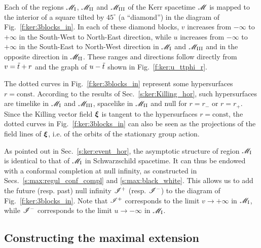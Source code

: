 Each of the regions $\mathscr{M}_{\rm I}$, $\mathscr{M}_{\rm II}$ and $\mathscr{M}_{\rm III}$ of the Kerr spacetime
$\mathscr{M}$ is mapped to the interior of a square tilted by $45^\circ$ (a ``diamond'')
in the diagram of Fig.~\ref{f:ker:3blocks_in}. In each of these diamond
blocks, $v$ increases from $-\infty$ to $+\infty$ in the South-West to North-East direction,
while $u$ increases from $-\infty$ to $+\infty$ in the South-East to North-West direction
in  $\mathscr{M}_{\rm I}$ and $\mathscr{M}_{\rm III}$ and in the opposite direction in $\mathscr{M}_{\rm II}$.
These ranges and directions follow directly from $v = {\tilde t} + r$
and the graph of $u - {\tilde t}$ shown in Fig.~\ref{f:ker:u_ttphi_r}.

The dotted curves in Fig.~\ref{f:ker:3blocks_in} represent some hypersurfaces
$r=\mathrm{const}$. According to the results
of Sec.~\ref{s:ker:Killing_hor}, such hypersurfaces are timelike in
$\mathscr{M}_{\rm I}$ and $\mathscr{M}_{\rm III}$, spacelike in $\mathscr{M}_{\rm II}$ and null for
$r=r_-$ or $r=r_+$. Since the Killing vector field $\bm{\xi}$ is tangent
to the hypersurfaces $r=\mathrm{const}$, the dotted curves in Fig.~\ref{f:ker:3blocks_in}
can also be seen as the projections of the field lines
of $\bm{\xi}$, i.e. of the orbits of the stationary group action.

As pointed out in Sec.~\ref{s:ker:event_hor}, the asymptotic structure of
region $\mathscr{M}_{\rm I}$ is identical to that of $\mathscr{M}_{\rm I}$ in Schwarzschild spacetime.
It can thus be endowed with a conformal completion at null infinity, as
constructed in Secs.~\ref{s:max:regul_conf_compl} and \ref{s:max:black_white}.
This allows us to add the future (resp. past) null infinity $\mathscr{I}^+$ (resp. $\mathscr{I}^-$)
to the diagram of Fig.~\ref{f:ker:3blocks_in}. Note that $\mathscr{I}^+$ corresponds to the
limit $v\to +\infty$ in $\mathscr{M}_{\rm I}$, while $\mathscr{I}^-$ corresponds to the limit
$u\to -\infty$ in $\mathscr{M}_{\rm I}$.

\subsection{Constructing the maximal extension}

